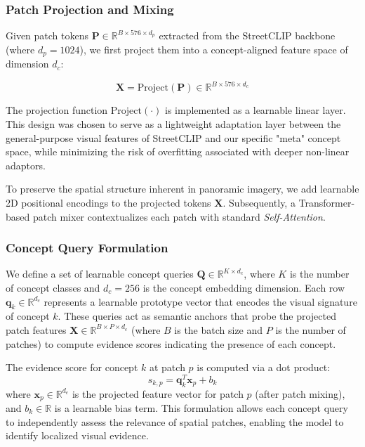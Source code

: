 \documentclass{article}
\begin{document}
\subsubsection{Patch Projection and Mixing}

Given patch tokens $\mathbf{P} \in \mathbb{R}^{B \times 576 \times d_p}$ extracted from the StreetCLIP backbone (where $d_p = 1024$), we first project them into a concept-aligned feature space of dimension $d_c$:

\begin{equation}
\mathbf{X} = \text{Project}(\mathbf{P}) \in \mathbb{R}^{B \times 576 \times d_c}
\end{equation}

The projection function $\text{Project}(\cdot)$ is implemented as a learnable linear layer. This design was chosen to serve as a lightweight adaptation layer between the general-purpose visual features of StreetCLIP and our specific "meta" concept space, while minimizing the risk of overfitting associated with deeper non-linear adaptors.

To preserve the spatial structure inherent in panoramic imagery, we add learnable 2D positional encodings to the projected tokens $\mathbf{X}$. Subsequently, a Transformer-based patch mixer contextualizes each patch with standard \textit{Self-Attention}.

\subsubsection{Concept Query Formulation}\label{sec:concept-queries}

We define a set of learnable concept queries $\mathbf{Q} \in \mathbb{R}^{K \times d_c}$, where $K$ is the number of concept classes and $d_c = 256$ is the concept embedding dimension. Each row $\mathbf{q}_k \in \mathbb{R}^{d_c}$ represents a learnable prototype vector that encodes the visual signature of concept $k$. These queries act as semantic anchors that probe the projected patch features $\mathbf{X} \in \mathbb{R}^{B \times P \times d_c}$ (where $B$ is the batch size and $P$ is the number of patches) to compute evidence scores indicating the presence of each concept.

The evidence score for concept $k$ at patch $p$ is computed via a dot product:
\begin{equation}
s_{k,p} = \mathbf{q}_k^T \mathbf{x}_p + b_k
\end{equation}
where $\mathbf{x}_p \in \mathbb{R}^{d_c}$ is the projected feature vector for patch $p$ (after patch mixing), and $b_k \in \mathbb{R}$ is a learnable bias term. This formulation allows each concept query to independently assess the relevance of spatial patches, enabling the model to identify localized visual evidence.
\end{document}
